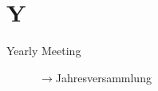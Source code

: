 \section*{Y}

\articlesize

\begin{description}
 \item[Yearly Meeting] $\to$Jahresversammlung
 \end{description}
\normalsize
